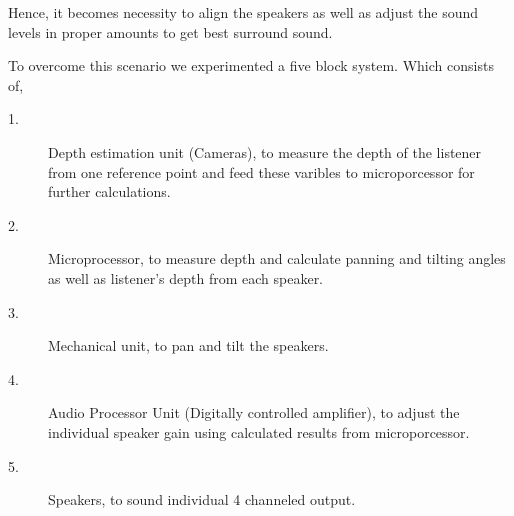 \documentclass[../../../patent_v1.tex]{subfiles}
\begin{document}
Hence, it becomes necessity to align the speakers as well as adjust the sound levels
in proper amounts to get best surround sound.

To overcome this scenario we experimented a five
block system. Which consists of,

\begin{description}
    \item[1.]Depth estimation unit (Cameras), to measure the depth of the listener
            from one reference point and feed these varibles to microporcessor for 
            further calculations.
    \item[2.]Microprocessor, to measure depth and calculate 
            panning and tilting angles as well as listener's depth
            from each speaker.
    \item[3.]Mechanical unit, to pan and tilt the speakers.
    \item[4.]Audio Processor Unit (Digitally controlled amplifier),
            to adjust the individual speaker gain using calculated 
            results from microporcessor.
    \item[5.]Speakers, to sound individual 4 channeled output.
\end{description} 
\end{document}
